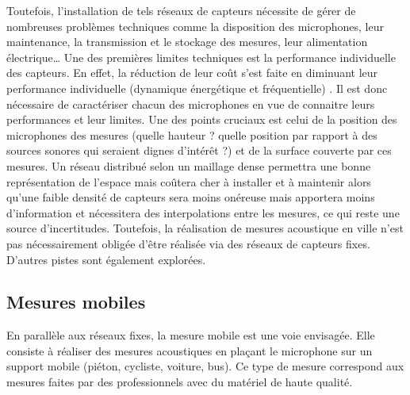 Toutefois, l'installation de tels réseaux de capteurs nécessite de gérer de nombreuses problèmes techniques comme la disposition des microphones, leur maintenance, la transmission et le stockage des mesures, leur alimentation électrique\dots{} Une des premières limites techniques est la performance individuelle des capteurs. En effet, la réduction de leur coût s'est faite en diminuant leur performance  individuelle (dynamique énergétique et fréquentielle) \cite{mydlarz2015design}. Il est donc nécessaire de caractériser chacun des microphones en vue de connaitre leurs performances et leur limites. Une des points cruciaux est celui de la position des microphones des mesures (quelle hauteur ? quelle position par rapport à des sources sonores qui seraient dignes d'intérêt ?) et de la surface couverte par ces mesures. Un réseau distribué selon un maillage dense permettra une bonne représentation de l'espace mais coûtera cher à installer et à maintenir alors qu'une faible densité de capteurs sera moins onéreuse mais apportera moins d'information et nécessitera des interpolations entre les mesures, ce qui reste une source d'incertitudes. Toutefois, la réalisation de mesures acoustique en ville n'est pas nécessairement obligée d'être réalisée via des réseaux de capteurs fixes. D'autres pistes sont également explorées.


\subsection{Mesures mobiles}

En parallèle aux réseaux fixes, la mesure mobile est une voie envisagée. Elle consiste à réaliser des mesures acoustiques en plaçant le microphone sur un support mobile (piéton, cycliste, voiture, bus). Ce type de mesure correspond aux mesures faites par des professionnels avec du matériel de haute qualité. 

